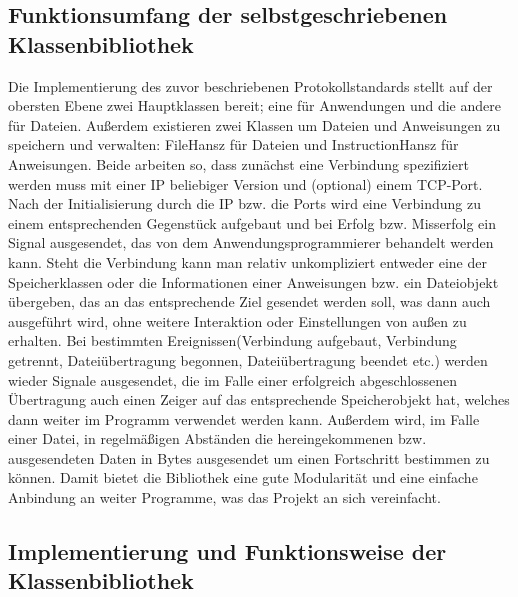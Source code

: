 \subsection{Funktionsumfang der selbstgeschriebenen Klassenbibliothek}
Die Implementierung des zuvor beschriebenen Protokollstandards stellt auf der obersten Ebene zwei Hauptklassen bereit; eine für Anwendungen und die andere für Dateien.
Außerdem existieren zwei Klassen um Dateien und Anweisungen zu speichern und verwalten: FileHansz für Dateien und InstructionHansz für Anweisungen.
Beide arbeiten so, dass zunächst eine Verbindung spezifiziert werden muss mit einer IP beliebiger Version und (optional) einem TCP-Port.
Nach der Initialisierung durch die IP bzw. die Ports wird eine Verbindung zu einem entsprechenden Gegenstück aufgebaut und bei Erfolg bzw. Misserfolg ein Signal ausgesendet, das von dem Anwendungsprogrammierer behandelt werden kann.
Steht die Verbindung kann man relativ unkompliziert entweder eine der Speicherklassen oder die Informationen einer Anweisungen bzw. ein Dateiobjekt übergeben, das an das entsprechende Ziel gesendet werden soll, was dann auch ausgeführt wird, ohne weitere Interaktion oder Einstellungen von außen zu erhalten.
Bei bestimmten Ereignissen(Verbindung aufgebaut, Verbindung getrennt, Dateiübertragung begonnen, Dateiübertragung beendet etc.) werden wieder Signale ausgesendet, die im Falle einer erfolgreich abgeschlossenen Übertragung auch einen Zeiger auf das entsprechende Speicherobjekt hat, welches dann weiter im Programm verwendet werden kann.
Außerdem wird, im Falle einer Datei, in regelmäßigen Abständen die hereingekommenen bzw. ausgesendeten Daten in Bytes ausgesendet um einen Fortschritt bestimmen zu können.
Damit bietet die Bibliothek eine gute Modularität und eine einfache Anbindung an weiter Programme, was das Projekt an sich vereinfacht.
\subsection{Implementierung und Funktionsweise der Klassenbibliothek}

%